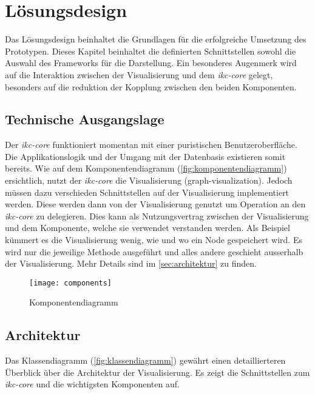 \chapter{Lösungsdesign}

Das Lösungsdesign beinhaltet die Grundlagen für die erfolgreiche Umsetzung des Prototypen. Dieses Kapitel beinhaltet die definierten Schnittstellen sowohl die Auswahl des Frameworks für die Darstellung. Ein besonderes Augenmerk wird auf die Interaktion zwischen der Visualisierung und dem \textit{ikc-core} gelegt, besonders auf die reduktion der Kopplung zwischen den beiden Komponenten. 

\section{Technische Ausgangslage}
Der \textit{ikc-core} funktioniert momentan mit einer puristischen Benutzeroberfläche. Die Applikationslogik und der Umgang mit der Datenbasis existieren somit bereits. Wie auf dem Komponentendiagramm (\autoref{fig:komponentendiagramm}) ersichtlich, nutzt der \textit{ikc-core} die Visualisierung (graph-visualization). Jedoch müssen dazu verschieden Schnittstellen auf der Visualisierung implementiert werden. Diese werden dann von der Visualisierung genutzt um Operation an den \textit{ikc-core} zu delegieren. Dies kann als Nutzungsvertrag zwischen der Visualisierung und dem Komponente, welche sie verwendet verstanden werden. Als Beispiel küm\-mert es die Visualisierung wenig, wie und wo ein Node gespeichert wird. Es wird nur die jeweilige Methode ausgeführt und alles andere geschieht ausserhalb der Vi\-su\-ali\-si\-erung. Mehr Details sind im \autoref{sec:architektur} zu finden.

\begin{figure}[htbp]
\centering
\texttt{[image: components]}
\caption{Komponentendiagramm}
\label{fig:komponentendiagramm}
\end{figure}

\section{Architektur}
\label{sec:architektur}

Das Klassendiagramm (\autoref{fig:klassendiagramm}) gewährt einen detaillierteren Überblick über die Architektur der Visualisierung. Es zeigt die Schnittstellen zum \textit{ikc-core} und die wichtigsten Komponenten auf.


